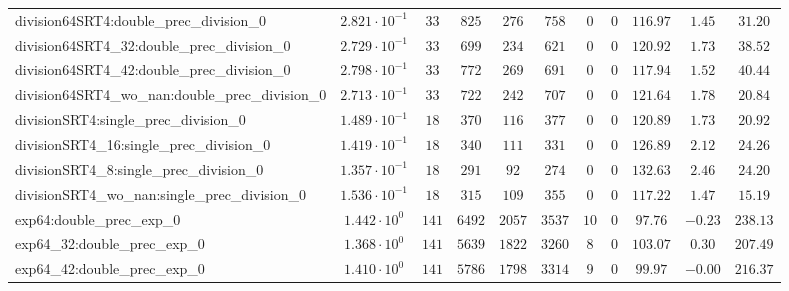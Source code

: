 \begin{tabular}{|l|c|c|c|c|c|c|c|c|c|c|}
division64SRT4:double\_prec\_division\_0                  & $ 2.821 \cdot 10^{-1} $ & $ 33     $ & $ 825    $ & $ 276   $ & $ 758   $ & $ 0   $ & $ 0 $ & $ 116.97      $ & $ 1.45    $ & $ 31.20   $ \\
division64SRT4\_32:double\_prec\_division\_0              & $ 2.729 \cdot 10^{-1} $ & $ 33     $ & $ 699    $ & $ 234   $ & $ 621   $ & $ 0   $ & $ 0 $ & $ 120.92      $ & $ 1.73    $ & $ 38.52   $ \\
division64SRT4\_42:double\_prec\_division\_0              & $ 2.798 \cdot 10^{-1} $ & $ 33     $ & $ 772    $ & $ 269   $ & $ 691   $ & $ 0   $ & $ 0 $ & $ 117.94      $ & $ 1.52    $ & $ 40.44   $ \\
division64SRT4\_wo\_nan:double\_prec\_division\_0         & $ 2.713 \cdot 10^{-1} $ & $ 33     $ & $ 722    $ & $ 242   $ & $ 707   $ & $ 0   $ & $ 0 $ & $ 121.64      $ & $ 1.78    $ & $ 20.84   $ \\
divisionSRT4:single\_prec\_division\_0                    & $ 1.489 \cdot 10^{-1} $ & $ 18     $ & $ 370    $ & $ 116   $ & $ 377   $ & $ 0   $ & $ 0 $ & $ 120.89      $ & $ 1.73    $ & $ 20.92   $ \\
divisionSRT4\_16:single\_prec\_division\_0                & $ 1.419 \cdot 10^{-1} $ & $ 18     $ & $ 340    $ & $ 111   $ & $ 331   $ & $ 0   $ & $ 0 $ & $ 126.89      $ & $ 2.12    $ & $ 24.26   $ \\
divisionSRT4\_8:single\_prec\_division\_0                 & $ 1.357 \cdot 10^{-1} $ & $ 18     $ & $ 291    $ & $ 92    $ & $ 274   $ & $ 0   $ & $ 0 $ & $ 132.63      $ & $ 2.46    $ & $ 24.20   $ \\
divisionSRT4\_wo\_nan:single\_prec\_division\_0           & $ 1.536 \cdot 10^{-1} $ & $ 18     $ & $ 315    $ & $ 109   $ & $ 355   $ & $ 0   $ & $ 0 $ & $ 117.22      $ & $ 1.47    $ & $ 15.19   $ \\
exp64:double\_prec\_exp\_0                                & $ 1.442 \cdot 10^{0}  $ & $ 141    $ & $ 6492   $ & $ 2057  $ & $ 3537  $ & $ 10  $ & $ 0 $ & $ 97.76       $ & $ -0.23   $ & $ 238.13  $ \\
exp64\_32:double\_prec\_exp\_0                            & $ 1.368 \cdot 10^{0}  $ & $ 141    $ & $ 5639   $ & $ 1822  $ & $ 3260  $ & $ 8   $ & $ 0 $ & $ 103.07      $ & $ 0.30    $ & $ 207.49  $ \\
exp64\_42:double\_prec\_exp\_0                            & $ 1.410 \cdot 10^{0}  $ & $ 141    $ & $ 5786   $ & $ 1798  $ & $ 3314  $ & $ 9   $ & $ 0 $ & $ 99.97       $ & $ -0.00   $ & $ 216.37  $ \\

\end{tabular}
